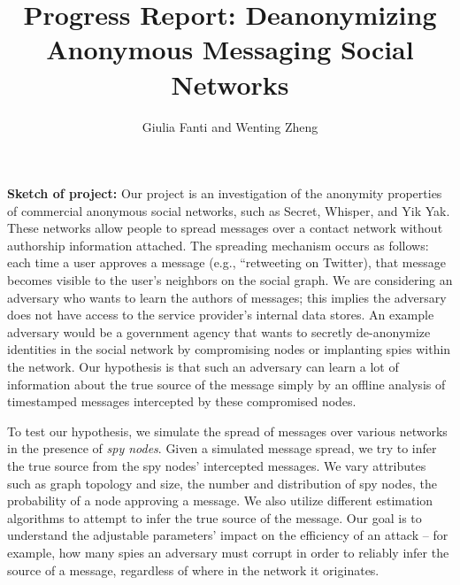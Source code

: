 \documentclass[11pt, onecolumn]{article}
\begin{document}
\title{Progress Report: Deanonymizing Anonymous Messaging Social Networks}

\author{Giulia Fanti and Wenting Zheng}

   \date{}
   \maketitle
   \thispagestyle{empty}
\textbf{Sketch of project:} Our project is an investigation of the anonymity properties of commercial anonymous social networks, such as Secret, Whisper, and Yik Yak. These networks allow people to spread messages over a contact network without authorship information attached. The spreading mechanism occurs as follows: each time a user approves a message (e.g., “retweeting  on Twitter), that message becomes visible to the user's neighbors on the social graph. 
%
We are considering an adversary who wants to learn the authors of messages; this implies the adversary does not have access to the service provider's internal data stores. An example adversary would be a government agency that wants to secretly de-anonymize identities in the social network by compromising nodes or implanting spies within the network.
Our hypothesis is that such an adversary can learn a lot of information about the true source of the message simply by an offline analysis of timestamped messages intercepted by these compromised nodes.

To test our hypothesis, we simulate the spread of messages over various networks in the presence of \emph{spy nodes}. Given a simulated message spread, we try to infer the true source from the spy nodes’ intercepted messages.  We vary attributes such as graph topology and size, the number and distribution of spy nodes, the probability of a node approving a message. We also utilize different estimation algorithms to attempt to infer the true source of the message.
Our goal is to understand the adjustable parameters' impact on the efficiency of an attack -- for example, how many spies an adversary must corrupt in order to reliably infer the source of a message, regardless of where in the network it originates.
\end{document}
